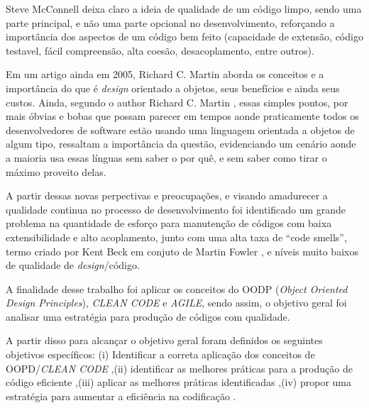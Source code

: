 \documentclass[12pt]{article}
\begin{document}
Steve McConnell \cite{CODE_COMPLETE_2} deixa claro a ideia de qualidade de um código limpo, sendo uma parte principal, e não uma parte opcional no desenvolvimento, reforçando a importância dos aspectos de um código bem feito (capacidade de extensão, código testavel, fácil compreensão, alta coesão, desacoplamento, entre outros).

Em um artigo ainda em 2005, Richard C. Martin \cite{THE_PRINCIPLES_OF_OOD} aborda os conceitos e a importância do que é \textit{design} orientado a objetos, seus benefícios e ainda seus custos.
Ainda, segundo o author Richard C. Martin \cite{THE_PRINCIPLES_OF_OOD}, essas simples pontos, por mais óbvias e bobas que possam parecer em tempos aonde praticamente todos os desenvolvedores de software estão usando uma linguagem orientada a objetos de algum tipo, ressaltam a importância da questão, evidenciando um cenário aonde a maioria usa essas línguas sem saber o por quê, e sem saber como tirar o máximo proveito delas.
	 

A partir dessas novas perpectivas e preocupações, e visando amadurecer a qualidade continua no processo de desenvolvimento foi identificado um grande problema na quantidade de esforço para manutenção de códigos com baixa extensibilidade e alto acoplamento, junto com uma alta taxa de “code smells”, termo criado por Kent Beck em conjuto de Martin Fowler \cite{MARTIN_FOWLER_REFACTORING}, e níveis muito baixos de qualidade de \textit{design}/código.



A finalidade desse trabalho foi aplicar os conceitos do OODP (\textit{Object Oriented Design Principles}), \textit{CLEAN CODE} e \textit{AGILE}, sendo assim, o objetivo geral foi analisar uma estratégia para produção de códigos com qualidade. 

A partir disso para alcançar o objetivo geral foram definidos os seguintes objetivos específicos: 
(i) Identificar a correta aplicação dos conceitos de OOPD/\textit{CLEAN CODE}
,(ii) identificar as melhores práticas para a produção de código eficiente
,(iii) aplicar as melhores práticas identificadas
,(iv) propor uma estratégia para aumentar a eficiência na codificação
.
\end{document}
